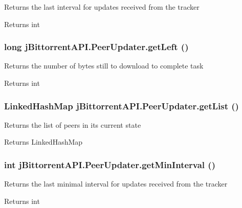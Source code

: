 Returns the last interval for updates received from the tracker \begin{DoxyReturn}{Returns}
int 
\end{DoxyReturn}
\hypertarget{classj_bittorrent_a_p_i_1_1_peer_updater_adc746875b9491ce52a930b404b11e9db}{
\subsubsection[{getLeft}]{\setlength{\rightskip}{0pt plus 5cm}long jBittorrentAPI.PeerUpdater.getLeft ()}}
\label{classj_bittorrent_a_p_i_1_1_peer_updater_adc746875b9491ce52a930b404b11e9db}
Returns the number of bytes still to download to complete task \begin{DoxyReturn}{Returns}
int 
\end{DoxyReturn}
\hypertarget{classj_bittorrent_a_p_i_1_1_peer_updater_ab7a3b7cfab6f53b0b5639e546ce9b28a}{
\subsubsection[{getList}]{\setlength{\rightskip}{0pt plus 5cm}LinkedHashMap jBittorrentAPI.PeerUpdater.getList ()}}
\label{classj_bittorrent_a_p_i_1_1_peer_updater_ab7a3b7cfab6f53b0b5639e546ce9b28a}
Returns the list of peers in its current state \begin{DoxyReturn}{Returns}
LinkedHashMap 
\end{DoxyReturn}
\hypertarget{classj_bittorrent_a_p_i_1_1_peer_updater_aaae6348e85643f01e4271e5adab95343}{
\subsubsection[{getMinInterval}]{\setlength{\rightskip}{0pt plus 5cm}int jBittorrentAPI.PeerUpdater.getMinInterval ()}}
\label{classj_bittorrent_a_p_i_1_1_peer_updater_aaae6348e85643f01e4271e5adab95343}
Returns the last minimal interval for updates received from the tracker \begin{DoxyReturn}{Returns}
int 
\end{DoxyReturn}
